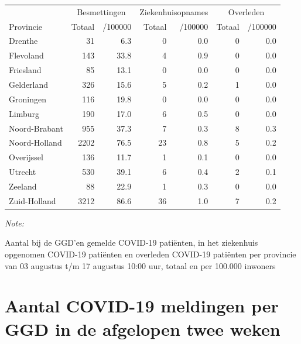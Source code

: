 \documentclass[
  english,
  man,floatsintext]{apa6}
\begin{document}
\begin{table}[H]
\centering
\begin{threeparttable}
\begin{tabular}{lrrrrrr}
\toprule
\multicolumn{1}{c}{ } & \multicolumn{2}{c}{Besmettingen} & \multicolumn{2}{c}{Ziekenhuisopnames} & \multicolumn{2}{c}{Overleden} \\
\cmidrule(l{3pt}r{3pt}){2-3} \cmidrule(l{3pt}r{3pt}){4-5} \cmidrule(l{3pt}r{3pt}){6-7}
Provincie & Totaal & /100000 & Totaal & /100000 & Totaal & /100000\\
\midrule
Drenthe & 31 & 6.3 & 0 & 0.0 & 0 & 0.0\\
Flevoland & 143 & 33.8 & 4 & 0.9 & 0 & 0.0\\
Friesland & 85 & 13.1 & 0 & 0.0 & 0 & 0.0\\
Gelderland & 326 & 15.6 & 5 & 0.2 & 1 & 0.0\\
Groningen & 116 & 19.8 & 0 & 0.0 & 0 & 0.0\\
Limburg & 190 & 17.0 & 6 & 0.5 & 0 & 0.0\\
Noord-Brabant & 955 & 37.3 & 7 & 0.3 & 8 & 0.3\\
Noord-Holland & 2202 & 76.5 & 23 & 0.8 & 5 & 0.2\\
Overijssel & 136 & 11.7 & 1 & 0.1 & 0 & 0.0\\
Utrecht & 530 & 39.1 & 6 & 0.4 & 2 & 0.1\\
Zeeland & 88 & 22.9 & 1 & 0.3 & 0 & 0.0\\
Zuid-Holland & 3212 & 86.6 & 36 & 1.0 & 7 & 0.2\\
\bottomrule
\end{tabular}
\begin{tablenotes}
\item \textit{Note: } 
\item Aantal bij de GGD’en gemelde COVID-19 patiënten, in het ziekenhuis opgenomen COVID-19 patiënten en overleden COVID-19 patiënten per provincie van 03 augustus t/m 17 augustus 10:00 uur, totaal en per 100.000 inwoners
\end{tablenotes}
\end{threeparttable}
\end{table}

\newpage

\hypertarget{aantal-covid-19-meldingen-per-ggd-in-de-afgelopen-twee-weken}{%
\section{Aantal COVID-19 meldingen per GGD in de afgelopen twee weken}\label{aantal-covid-19-meldingen-per-ggd-in-de-afgelopen-twee-weken}}
\end{document}
